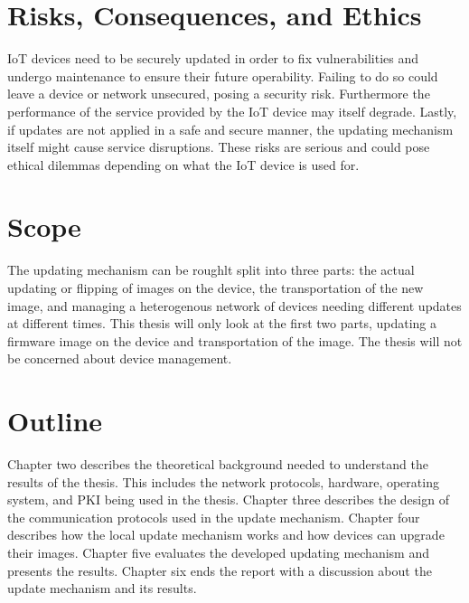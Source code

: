 \documentclass[0-thesis.tex]{subfiles}
\begin{document}
\section{Risks, Consequences, and Ethics}
IoT devices need to be securely updated in order to fix vulnerabilities and undergo maintenance to ensure 
their future operability. Failing to do so could leave a device or network unsecured, posing a security risk. 
Furthermore the performance of the service provided by the IoT device may itself degrade. Lastly, if updates 
are not applied in a safe and secure manner, the updating mechanism itself might cause service disruptions.
These risks are serious and could pose ethical dilemmas depending on what the IoT device is used for.

\section{Scope}
The updating mechanism can be roughlt split into three parts: the actual updating or flipping of 
images on the device, the transportation of the new image, and managing a heterogenous network
of devices needing different updates at different times. This thesis will only look at the first 
two parts, updating a firmware image on the device and transportation of the image. The thesis 
will not be concerned about device management.

\section{Outline}
Chapter two describes the theoretical background needed to understand the results of the thesis.
This includes the network protocols, hardware, operating system, and PKI being used in the thesis.
Chapter three describes the design of the communication protocols used in the update mechanism.
Chapter four describes how the local update mechanism works and how devices can upgrade their 
images.
Chapter five evaluates the developed updating mechanism and presents the results.
Chapter six ends the report with a discussion about the update mechanism and its results.
\end{document}
